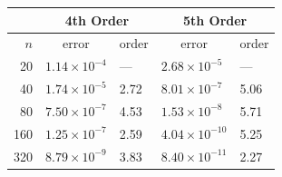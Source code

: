 \documentclass[10pt]{beamer}
\begin{document}
\begin{frame}
\begin{table}
          \centering
          \begin{tabular}{r*{4}l}
            \toprule
            & \multicolumn{2}{c}{4th Order} & \multicolumn{2}{c}{5th Order} \\
            \midrule
            \(n\) & \multicolumn{1}{c}{error} & order & \multicolumn{1}{c}{error} & order \\
            \midrule
             20 & \( 1.14 \times 10^{-4} \) &  --- & \( 2.68 \times 10^{ -5} \) & ---  \\
             40 & \( 1.74 \times 10^{-5} \) & 2.72 & \( 8.01 \times 10^{ -7} \) & 5.06 \\
             80 & \( 7.50 \times 10^{-7} \) & 4.53 & \( 1.53 \times 10^{ -8} \) & 5.71 \\
            160 & \( 1.25 \times 10^{-7} \) & 2.59 & \( 4.04 \times 10^{-10} \) & 5.25 \\
            320 & \( 8.79 \times 10^{-9} \) & 3.83 & \( 8.40 \times 10^{-11} \) & 2.27 \\
            \bottomrule
          \end{tabular}
        \end{table}
    \end{frame}
\end{document}
